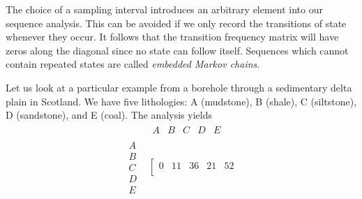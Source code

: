 	The choice of a sampling interval introduces an arbitrary element into our sequence analysis.  
This can be avoided if we only record the transitions of state whenever they occur.  It follows 
that the transition frequency matrix will have zeros along the diagonal since no state can follow 
itself.  Sequences which cannot contain repeated states are called \emph{embedded Markov chains}.
\begin{example}
	Let us look at a particular example from a borehole through a sedimentary delta plain in
Scotland.  We have five lithologies: A (mudstone), B (shale), C (siltstone), D 
(sandstone), and E (coal).  The analysis yields
\begin{equation}
\begin{array}{*{20}{c}}
{}&{\begin{array}{*{20}{c}}
A&B&C&D&E
\end{array}}\\
{\begin{array}{*{20}{c}}
A\\
B\\
C\\
D\\
E
\end{array}}&{\left[ {\begin{array}{*{20}{c}}
0&{11}&{36}&{21}&{52}\\

\end{array}}}
\end{array}
\end{equation}
\end{example}
